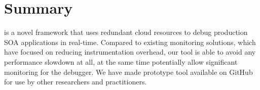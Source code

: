 

\section{Summary}
\label{sec:parikshanSummary}

\parikshan is a novel framework that uses redundant cloud resources to debug production SOA applications in real-time.
Compared to existing monitoring solutions, which have focused on reducing instrumentation overhead, our tool is able to avoid any performance slowdown at all, at the same time potentially allow significant monitoring for the debugger.
We have made \parikshan prototype tool available on GitHub for use by other researchers and practitioners.

